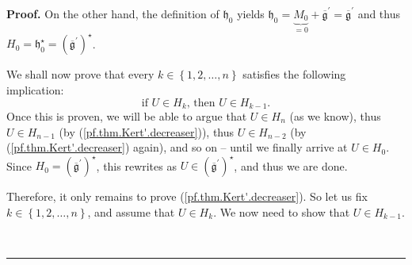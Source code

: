 \documentclass[numbers=enddot,12pt,final,onecolumn,notitlepage]{scrartcl}%
\theoremstyle{definition}
\newenvironment{proof}[1][Proof]{\noindent\textbf{#1.} }{\ \rule{0.5em}{0.5em}}
\begin{document}
\begin{proof}
On the other hand, the definition of $\mathfrak{h}_{0}$ yields $\mathfrak{h}%
_{0}=\underbrace{M_{0}}_{=0}+\overline{\mathfrak{g}}^{\prime}=\overline
{\mathfrak{g}}^{\prime}$ and thus $H_{0}=\mathfrak{h}_{0}^{\star}=\left(
\overline{\mathfrak{g}}^{\prime}\right)  ^{\star}$.

We shall now prove that every $k\in\left\{  1,2,\ldots,n\right\}  $ satisfies
the following implication:%
\begin{equation}
\text{if }U\in H_{k}\text{, then }U\in H_{k-1}. \label{pf.thm.Kert'.decreaser}%
\end{equation}
Once this is proven, we will be able to argue that $U\in H_{n}$ (as we know),
thus $U\in H_{n-1}$ (by (\ref{pf.thm.Kert'.decreaser})), thus $U\in H_{n-2}$
(by (\ref{pf.thm.Kert'.decreaser}) again), and so on -- until we finally
arrive at $U\in H_{0}$. Since $H_{0}=\left(  \overline{\mathfrak{g}}^{\prime
}\right)  ^{\star}$, this rewrites as $U\in\left(  \overline{\mathfrak{g}%
}^{\prime}\right)  ^{\star}$, and thus we are done.

Therefore, it only remains to prove (\ref{pf.thm.Kert'.decreaser}). So let us
fix $k\in\left\{  1,2,\ldots,n\right\}  $, and assume that $U\in H_{k}$. We
now need to show that $U\in H_{k-1}$.


\end{proof}
\end{document}
